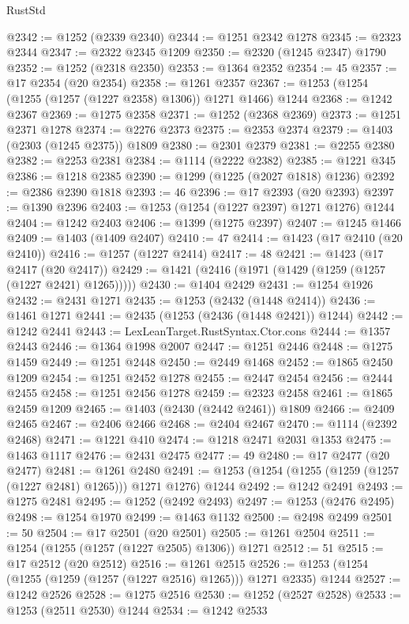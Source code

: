 \begin{lexlean}{RustStd}
\begin{coremodule}
@2342 := @1252 (@2339 @2340)
@2344 := @1251 @2342 @1278
@2345 := @2323 @2344
@2347 := @2322 @2345 @1209
@2350 := @2320 (@1245 @2347) @1790
@2352 := @1252 (@2318 @2350)
@2353 := @1364 @2352
@2354 := 45
@2357 := @17 @2354 (@20 @2354)
@2358 := @1261 @2357
@2367 := @1253 (@1254 (@1255 (@1257 (@1227 @2358) @1306)) @1271 @1466) @1244
@2368 := @1242 @2367
@2369 := @1275 @2358
@2371 := @1252 (@2368 @2369)
@2373 := @1251 @2371 @1278
@2374 := @2276 @2373
@2375 := @2353 @2374
@2379 := @1403 (@2303 (@1245 @2375)) @1809
@2380 := @2301 @2379
@2381 := @2255 @2380
@2382 := @2253 @2381
@2384 := @1114 (@2222 @2382)
@2385 := @1221 @345
@2386 := @1218 @2385
@2390 := @1299 (@1225 (@2027 @1818) @1236)
@2392 := @2386 @2390 @1818
@2393 := 46
@2396 := @17 @2393 (@20 @2393)
@2397 := @1390 @2396
@2403 := @1253 (@1254 (@1227 @2397) @1271 @1276) @1244
@2404 := @1242 @2403
@2406 := @1399 (@1275 @2397)
@2407 := @1245 @1466
@2409 := @1403 (@1409 @2407)
@2410 := 47
@2414 := @1423 (@17 @2410 (@20 @2410))
@2416 := @1257 (@1227 @2414)
@2417 := 48
@2421 := @1423 (@17 @2417 (@20 @2417))
@2429 := @1421 (@2416 (@1971 (@1429 (@1259 (@1257 (@1227 @2421) @1265)))))
@2430 := @1404 @2429
@2431 := @1254 @1926
@2432 := @2431 @1271
@2435 := @1253 (@2432 (@1448 @2414))
@2436 := @1461 @1271
@2441 := @2435 (@1253 (@2436 (@1448 @2421)) @1244)
@2442 := @1242 @2441
@2443 := LexLeanTarget.RustSyntax.Ctor.cons
@2444 := @1357 @2443
@2446 := @1364 @1998 @2007
@2447 := @1251 @2446
@2448 := @1275 @1459
@2449 := @1251 @2448
@2450 := @2449 @1468
@2452 := @1865 @2450 @1209
@2454 := @1251 @2452 @1278
@2455 := @2447 @2454
@2456 := @2444 @2455
@2458 := @1251 @2456 @1278
@2459 := @2323 @2458
@2461 := @1865 @2459 @1209
@2465 := @1403 (@2430 (@2442 @2461)) @1809
@2466 := @2409 @2465
@2467 := @2406 @2466
@2468 := @2404 @2467
@2470 := @1114 (@2392 @2468)
@2471 := @1221 @410
@2474 := @1218 @2471 @2031 @1353
@2475 := @1463 @1117
@2476 := @2431 @2475
@2477 := 49
@2480 := @17 @2477 (@20 @2477)
@2481 := @1261 @2480
@2491 := @1253 (@1254 (@1255 (@1259 (@1257 (@1227 @2481) @1265))) @1271 @1276) @1244
@2492 := @1242 @2491
@2493 := @1275 @2481
@2495 := @1252 (@2492 @2493)
@2497 := @1253 (@2476 @2495)
@2498 := @1254 @1970
@2499 := @1463 @1132
@2500 := @2498 @2499
@2501 := 50
@2504 := @17 @2501 (@20 @2501)
@2505 := @1261 @2504
@2511 := @1254 (@1255 (@1257 (@1227 @2505) @1306)) @1271
@2512 := 51
@2515 := @17 @2512 (@20 @2512)
@2516 := @1261 @2515
@2526 := @1253 (@1254 (@1255 (@1259 (@1257 (@1227 @2516) @1265))) @1271 @2335) @1244
@2527 := @1242 @2526
@2528 := @1275 @2516
@2530 := @1252 (@2527 @2528)
@2533 := @1253 (@2511 @2530) @1244
@2534 := @1242 @2533

\end{coremodule}
\end{lexlean}
